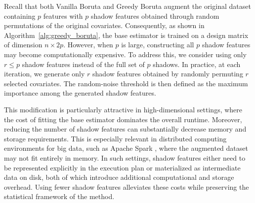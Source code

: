 \documentclass[runningheads]{llncs}
\begin{document}
Recall that both Vanilla Boruta and Greedy Boruta augment the original dataset containing \(p\) features with \(p\) shadow features obtained through random permutations of the original covariates. Consequently, as shown in Algorithm~\ref{alg:greedy_boruta}, the base estimator is trained on a design matrix of dimension \(n \times 2p\). However, when \(p\) is large, constructing all \(p\) shadow features may become computationally expensive. To address this, we consider using only \(r \leq p\) shadow features instead of the full set of \(p\) shadows. In practice, at each iteration, we generate only \(r\) shadow features obtained by randomly permuting \(r\) selected covariates. The random-noise threshold is then defined as the maximum importance among the generated shadow features.

This modification is particularly attractive in high-dimensional settings, where the cost of fitting the base estimator dominates the overall runtime. Moreover, reducing the number of shadow features can substantially decrease memory and storage requirements. This is especially relevant in distributed computing environments for big data, such as Apache Spark \cite{zaharia2016spark}, where the augmented dataset may not fit entirely in memory. In such settings, shadow features either need to be represented explicitly in the execution plan or materialized as intermediate data on disk, both of which introduce additional computational and storage overhead. Using fewer shadow features alleviates these costs while preserving the statistical framework of the method.



\end{document}
